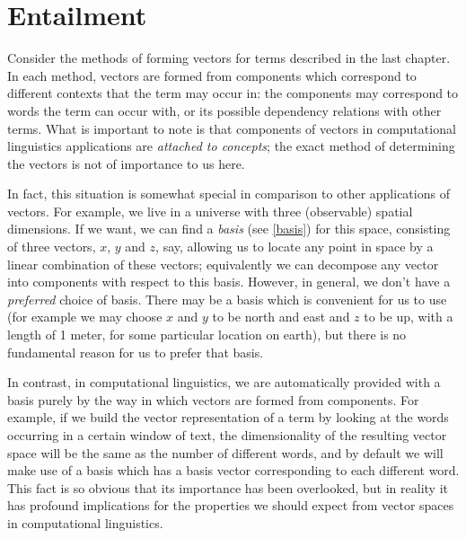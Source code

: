 
\section{Entailment}

Consider the methods of forming vectors for terms described in the last chapter. In each method, vectors are formed from components which correspond to different contexts that the term may occur in: the components may correspond to words the term can occur with, or its possible dependency relations with other terms. What is important to note is that components of vectors in computational linguistics applications are \emph{attached to concepts}; the exact method of determining the vectors is not of importance to us here.

In fact, this situation is somewhat special in comparison to other applications of vectors. For example, we live in a universe with three (observable) spatial dimensions. If we want, we can find a \emph{basis} (see \ref{basis}) for this space, consisting of three vectors, $x$, $y$ and $z$, say, allowing us to locate any point in space by a linear combination of these vectors; equivalently we can decompose any vector into components with respect to this basis. However, in general, we don't have a \emph{preferred} choice of basis. There may be a basis which is convenient for us to use (for example we may choose $x$ and $y$ to be north and east and $z$ to be up, with a length of 1 meter, for some particular location on earth), but there is no fundamental reason for us to prefer that basis.

In contrast, in computational linguistics, we are automatically provided with a basis purely by the way in which vectors are formed from components. For example, if we build the vector representation of a term by looking at the words occurring in a certain window of text, the dimensionality of the resulting vector space will be the same as the number of different words, and by default we will make use of a basis which has a basis vector corresponding to each different word. This fact is so obvious that its importance has been overlooked, but in reality it has profound implications for the properties we should expect from vector spaces in computational linguistics.

